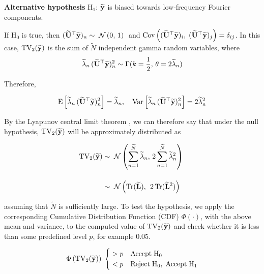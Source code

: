 {        \textbf{Alternative hypothesis }$\text{H}_1$: $\widetilde{\mathbf{y}}$ is biased towards low-frequency Fourier components. 

        \vspace*{0.5cm}

        If $\text{H}_0$ is true, then $(\widetilde{\mathbf{U}}^\top\widetilde{\mathbf{y}})_n \sim \; \mathcal{N}\left(0, \, 1\right) \;$ and $\text{Cov}\left((\widetilde{\mathbf{U}}^\top\widetilde{\mathbf{y}})_i, \; (\widetilde{\mathbf{U}}^\top\widetilde{\mathbf{y}})_j \right) = \delta_{ij}$. In this case, $\text{TV}_2(\widetilde{\mathbf{y}}) $ is the sum of $\widetilde{N}$ independent gamma random variables, where
        $$
        \widetilde{\lambda}_n  \, (\widetilde{\mathbf{U}}^\top\widetilde{\mathbf{y}})_n^2 \sim \Gamma(k = \frac{1}{2}, \, \theta=2 \widetilde{\lambda}_n)
        $$

        Therefore, 

        $$
        \text{E}\left[ \widetilde{\lambda}_n  \, (\widetilde{\mathbf{U}}^\top\widetilde{\mathbf{y}})_n^2 \right]  = \widetilde{\lambda}_n, \quad  \text{Var}\left[  \widetilde{\lambda}_n  \, (\widetilde{\mathbf{U}}^\top\widetilde{\mathbf{y}})_n^2 \right] = 2 \widetilde{\lambda}_n^2
        $$

        \vspace*{0.5cm}

        By the Lyapunov central limit theorem \citep{Feller1968}, we can therefore say that under the null hypothesis, $\text{TV}_2(\widetilde{\mathbf{y}})$ will be approximately distributed as 

        \begin{align*}
        \text{TV}_2(\widetilde{\mathbf{y}}) &\sim \; \mathcal{N}\left(  \sum_{n=1}^{\widetilde{N}} \widetilde{\lambda}_n , \, 2\sum_{n=1}^{\widetilde{N}} \widetilde{\lambda}_n^2\right) \; \\[0.4cm]
        &\sim \; \mathcal{N}\left(\text{Tr}(\widetilde{\mathbf{L}}) , \, \;2\,\text{Tr}(\widetilde{\mathbf{L}}^2) \right) \;
        \end{align*}

        \vspace*{0.3cm}

        assuming that $\widetilde{N}$ is sufficiently large. To test the hypothesis, we apply the corresponding Cumulative Distribution Function (CDF) $\Phi(\cdot)$, with the above mean and variance, to the computed value of $\text{TV}_2(\widetilde{\mathbf{y}})$ and check whether it is less than some predefined level $p$, for example 0.05. 

        \vspace*{0.3cm}

        $$
        \Phi\left(\text{TV}_2(\widetilde{\mathbf{y}})\right) \;\begin{cases}
           \; > p & \text{Accept} \; \text{H}_0 \\
           \;  < p & \text{Reject} \; \text{H}_0, \; \text{Accept} \; \text{H}_1
        \end{cases}
        $$
        
}
